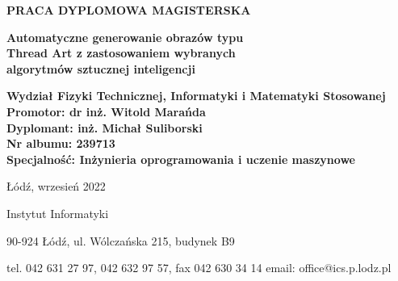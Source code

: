 {\begin{titlepage}
    \begin{center}
        \vspace*{1.53cm}
        {\selectfont\large
        \uppercase{\textbf{PRACA DYPLOMOWA MAGISTERSKA}}
        
        \vspace*{5.1cm}
        
        \fontsize{18pt}{22pt}\selectfont
        \textbf{Automatyczne generowanie obrazów typu\\Thread Art z zastosowaniem wybranych\\algorytmów sztucznej inteligencji}}
        
        \vfill
    \end{center}
    
    {\selectfont\normalsize
    \begin{adjustwidth}{1cm}{0pt}
    \begin{flushleft}
        \textbf{Wydział Fizyki Technicznej, Informatyki i Matematyki Stosowanej}\\
        \textbf{Promotor: dr inż. Witold Marańda}\\
        \textbf{Dyplomant: inż. Michał Suliborski}\\
        \textbf{Nr albumu: 239713}\\
        \textbf{Specjalność: Inżynieria oprogramowania i uczenie maszynowe}
    \end{flushleft}
    \end{adjustwidth}
    
    \begin{center}
        \L{}\'od\'z, wrzesień 2022
        \vspace*{2.05cm}
    \end{center}}
    
    \begin{adjustwidth}{0cm}{0pt}
    \begin{flushleft}
        {\selectfont\footnotesize
        \textcolor{politechniczny}{Instytut Informatyki}}
        
        \vspace*{0.1cm}
        
        {\selectfont\tiny
        90-924 \L{}\'od\'z, ul. W\'olcza\'nska 215, \textcolor{politechniczny}{budynek B9}
        
        \vspace*{-0.5cm}
        
        tel. 042 631 27 97, 042 632 97 57, fax 042 630 34 14 email: office@ics.p.lodz.pl}
        
        \vspace{-1.4cm}
    \end{flushleft}
    \end{adjustwidth}
    
\end{titlepage}}
\renewcommand{\baselinestretch}{1.5}
\newpage